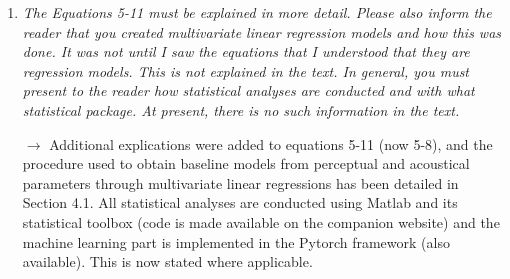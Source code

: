 \documentclass[10pt]{article}
\begin{document}
\begin{enumerate}
\item \emph{The Equations 5-11 must be explained in more detail. Please also inform the reader that you created multivariate linear regression models and how this was done. It was not until I saw the equations that I understood that they are regression models. This is not explained in the text. In general, you must present to the reader how statistical analyses are conducted and with what statistical package. At present, there is no such information in the text.}

$\rightarrow$ Additional explications were added to equations 5-11 (now 5-8), and the procedure used to obtain baseline models from perceptual and acoustical parameters through multivariate linear regressions has been detailed in Section 4.1. All statistical analyses are conducted using Matlab and its statistical toolbox (code is made available on the companion website) and the machine learning part is implemented in the Pytorch framework (also available). This is now stated where applicable.

\end{enumerate}



\end{document}
